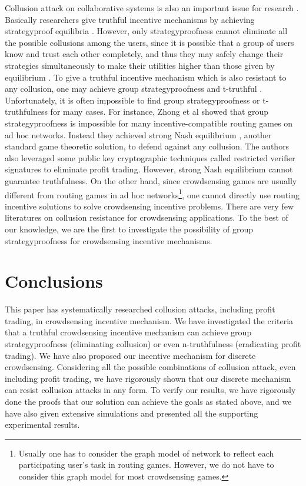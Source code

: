 \documentclass[conference]{IEEEtran}
\theoremstyle{definition}
\begin{document}
Collusion attack on collaborative systems is also an important issue for research \cite{feng2013imac, chen2013sparc, zhong2007designing, zheng2014strategy}. Basically researchers give truthful incentive mechanisms by achieving strategyproof equilibria \cite{feng2013imac}. However, only strategyproofness cannot eliminate all the possible collusions among the users, since it is possible that a group of users know and trust each other completely, and thus they may safely change their strategies simultaneously to make their utilities higher than those given by equilibrium \cite{goldberg2005collusion, zhong2007designing}. To give a truthful incentive mechanism which is also resistant to any collusion, one may achieve group strategyproofness \cite{jain1999group, mas1995microeconomic} and t-truthful \cite{goldberg2005collusion,goldberg2003competitiveness}. Unfortunately, it is often impossible to find group strategyproofness or t-truthfulness for many cases. For instance, Zhong et al \cite{zhong2007designing} showed that group strategyproofness is impossible for many incentive-compatible routing games on ad hoc networks. Instead they achieved strong Nash equilibrium \cite{aumann1959acceptable, mas1995microeconomic}, another standard game theoretic solution, to defend against any collusion. The authors also leveraged some public key cryptographic techniques called restricted verifier signatures to eliminate profit trading. However, strong Nash equilibrium cannot guarantee truthfulness. On the other hand, since crowdsensing games are usually different from routing games in ad hoc networks\footnote{Usually one has to consider the graph model of network to reflect each participating user's task in routing games. However, we do not have to consider this graph model for most crowdsensing games.}, one cannot directly use routing incentive solutions to solve crowdsensing incentive problems. There are very few literatures on collusion resistance for crowdsensing applications. To the best of our knowledge, we are the first to investigate the possibility of group strategyproofness for crowdsensing incentive mechanisms.

\section{Conclusions}
\label{sec:con}
This paper has systematically researched collusion attacks, including profit trading, in crowdsensing incentive mechanism. We have investigated the criteria that a truthful crowdsensing incentive mechanism can achieve group strategyproofness (eliminating collusion) or even n-truthfulness (eradicating profit trading). We have also proposed our incentive mechanism for discrete crowdsensing. {\color{blue}Considering all the possible combinations of collusion attack, even including profit trading, we have rigorously shown that our discrete mechanism can resist collusion attacks in any form.} To verify our results, we have rigorously done the proofs that our solution can achieve the goals as stated above, and we have also given extensive simulations and presented all the supporting experimental results.
\end{document}
